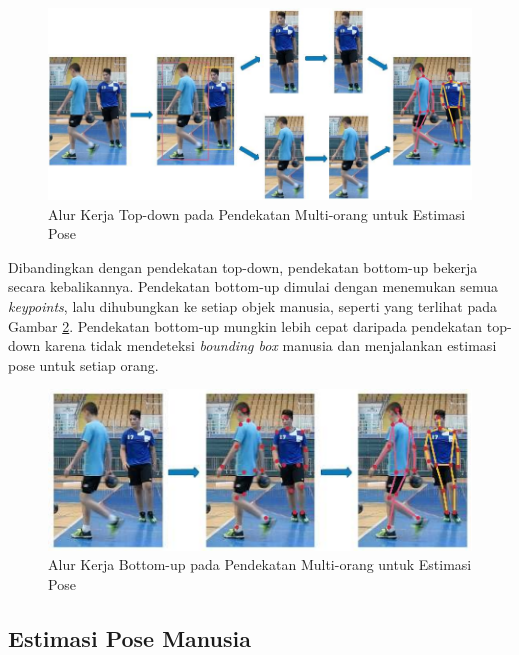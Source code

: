 \begin{figure}[ht]
  \centering
  \includegraphics[scale=0.8]{gambar/top-down-approach.png}
  \caption{Alur Kerja Top-down pada Pendekatan Multi-orang untuk Estimasi Pose}
  \label{fig:top-down-approach}
\end{figure}

Dibandingkan dengan pendekatan top-down, pendekatan bottom-up bekerja secara kebalikannya. Pendekatan bottom-up dimulai dengan menemukan semua \emph{keypoints}, lalu dihubungkan ke setiap objek manusia, seperti yang terlihat pada Gambar \ref{fig:bottom-up-approach}.
Pendekatan bottom-up mungkin lebih cepat daripada pendekatan top-down karena tidak mendeteksi \emph{bounding box} manusia dan menjalankan estimasi pose untuk setiap orang.

\begin{figure}[ht]
  \centering
  \includegraphics[scale=1.2]{gambar/bottom-up-approach.png}
  \caption{Alur Kerja Bottom-up pada Pendekatan Multi-orang untuk Estimasi Pose}
  \label{fig:bottom-up-approach}
\end{figure}

\subsection{Estimasi Pose Manusia}
\label{subsec:estimasi-pose-manusia}

